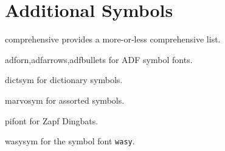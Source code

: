\documentclass[a4paper,welsh,british,twocolumn]{article}
\begin{document}
\section*{Additional Symbols}\label{sec:symbols}
\begin{pkgdescription}
  \item[comprehensive] provides a more-or-less comprehensive list.
  \item[adforn,adfarrows,adfbullets] for ADF symbol fonts.
  \item[dictsym] for dictionary symbols.
  \item[marvosym] for assorted symbols.
  \item[pifont] for Zapf Dingbats.
  \item[wasysym] for the symbol font \texttt{wasy}.
\end{pkgdescription}
\end{document}
